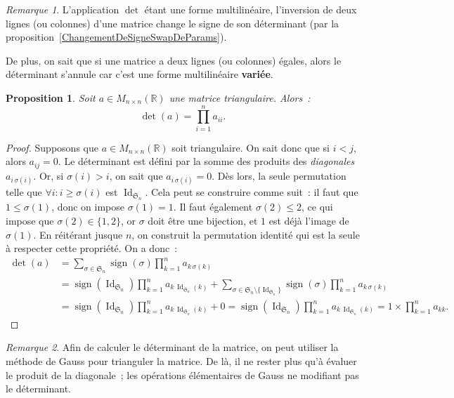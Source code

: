 \documentclass{article}
\DeclareMathOperator{\Id}{Id}
\DeclareMathOperator{\sign}{sign}
\newcommand{\R}{\mathbb R}
\newcommand{\M}[3]{M_{#1 \times #2}(#3)}
\newcommand{\Perm}{\mathfrak{S}}
\newtheorem{prp}[thm]{Proposition}
\theoremstyle{definition}
\theoremstyle{remark}
\newtheorem*{rmq}{Remarque}
\begin{document}
		\begin{rmq} L'application $\det$ étant une forme multilinéaire, l'inversion de deux lignes (ou colonnes) d'une matrice change le signe de son déterminant
		(par la proposition~\ref{ChangementDeSigneSwapDeParams}).

		De plus, on sait que si une matrice a deux lignes (ou colonnes) égales, alors le déterminant s'annule car c'est une forme multilinéaire \textbf{variée}.
		\end{rmq}

		\begin{prp}\label{detMatriceTriangulaire} Soit $a \in \M nn\R$ une matrice triangulaire. Alors~:
		\[\det(a) = \prod_{i=1}^na_{ii}.\] \end{prp}

		\begin{proof} Supposons que $a \in \M nn\R$ soit triangulaire. On sait donc que si $i < j$, alors $a_{ij} = 0$. Le déterminant est défini par la somme des produits
		des \textit{diagonales} $a_{i\,\sigma(i)}$. Or, si $\sigma(i) > i$, on sait que $a_{i\,\sigma(i)} = 0$. Dès lors, la seule permutation telle que
		$\forall i : i \geq \sigma(i)$ est $\Id_{\Perm_n}$. Cela peut se construire comme suit~: il faut que $1 \leq \sigma(1)$, donc on impose $\sigma(1) = 1$. Il faut
		également $\sigma(2) \leq 2$, ce qui impose que $\sigma(2) \in \{1, 2\}$, or $\sigma$ doit être une bijection, et $1$ est déjà l'image de $\sigma(1)$. En
		réitérant jusque $n$, on construit la permutation identité qui est la seule à respecter cette propriété. On a donc~:
		\[\begin{aligned}
			\det(a) &= \sum_{\sigma\in\Perm_n}\sign(\sigma)\prod_{k=1}^na_{k\,\sigma(k)} \\
			&= \sign(\Id_{\Perm_n})\prod_{k=1}^na_{k\,\Id_{\Perm_n}(k)} + \sum_{\sigma \in \Perm_n \setminus \{\Id_{\Perm_n}\}}\sign(\sigma)\prod_{k=1}^na_{k\,\sigma(k)} \\
			&= \sign(\Id_{\Perm_n})\prod_{k=1}^na_{k\,\Id_{\Perm_n}(k)} + 0 = \sign(\Id_{\Perm_n})\prod_{k=1}^na_{k\,\Id_{\Perm_n}(k)} = 1 \times \prod_{k=1}^na_{kk}.
		\end{aligned}\] \end{proof}

		\begin{rmq} Afin de calculer le déterminant de la matrice, on peut utiliser la méthode de Gauss pour trianguler la matrice. De là, il ne rester plus qu'à
		évaluer le produit de la diagonale~; les opérations élémentaires de Gauss ne modifiant pas le déterminant. \end{rmq}
\end{document}
